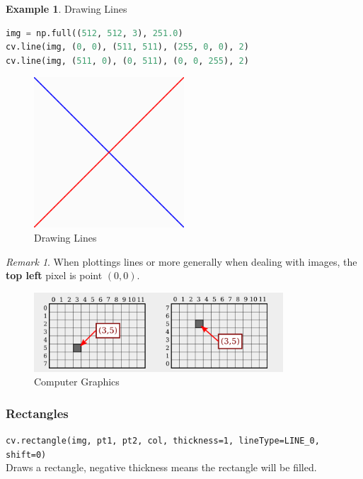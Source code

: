 \documentclass{article}
\theoremstyle{definition}
\newtheorem{ex}{Example}[subsection]
\theoremstyle{remark}
\newtheorem*{rem}{Remark}
\newcommand{\func}[2]{\noindent\lstinline{#1}\\#2}
\begin{document}
\begin{ex} Drawing Lines
\begin{lstlisting}[language=Python]
img = np.full((512, 512, 3), 251.0)
cv.line(img, (0, 0), (511, 511), (255, 0, 0), 2)
cv.line(img, (511, 0), (0, 511), (0, 0, 255), 2)
\end{lstlisting}

\begin{figure}[h!]
    \centering
    \includegraphics[width=0.5\textwidth]{opencv_lines}
    \caption{Drawing Lines}
    \label{fig:ocv_drw_lin}
\end{figure}

\end{ex}

\begin{rem}
    When plottings lines or more generally when dealing with images, the \textbf{top left} pixel is point $ (0, 0) $. 
\end{rem}


\begin{figure}[h!]
    \centering
    \includegraphics[width=0.83\textwidth]{computer_graphics}
    \caption{Computer Graphics}
    \label{fig:comp_graph}
\end{figure}

\subsubsection{Rectangles}

\func{cv.rectangle(img, pt1, pt2, col, thickness=1, lineType=LINE_0, shift=0)}{
Draws a rectangle, negative thickness means the rectangle will be filled.
}
\end{document}
